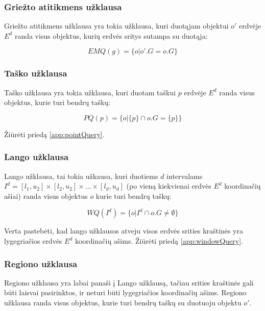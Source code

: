 \subsubsection{Griežto atitikmens užklausa}
Griežto atitikmens užklausa yra tokia užklausa, kuri duotąjam objektui $o'$ erdvėje $E^d$ randa visus objektus, kurių erdvės sritys sutampa su duotąja:

\begin{equation}
	EMQ(g) = \{ o | o'.G = o.G \}
\label{eq:ExactMatchQuery}
\end{equation}

\subsubsection{Taško užklausa}
Taško užklausa yra tokia užklausa, kuri duotam taškui $p$ erdvėje $E^d$ randa visus objektus, kurie turi bendrų taškų:

\begin{equation}
	PQ(p) = \{ o | \{p\} \cap o.G = \{p\} \}
\label{eq:ExactMatchQuery}
\end{equation}

Žiūrėti priedą \ref{app:pointQuery}.

\subsubsection{Lango užklausa}
Lango užklausa, tai tokia užkausa, kuri duotiems $d$ intervalams $I^d = [l_1, u_2] \times [l_2, u_2] \times ... \times [l_d, u_d]$ (po vieną kiekvienai erdvės $E^d$ koordinačių ašiai) randa visus objektus $o$ kurie turi bendrų taškų:

\begin{equation}
	WQ(I^d) = \{ o | I^d \cap o.G \neq \emptyset \}
\label{eq:ExactMatchQuery}
\end{equation}

Verta pastebėti, kad lango užklausos atveju visos erdvės srities kraštinės yra lygegriačios erdvės $E^d$ koordinačių ašims.
Žiūrėti priedą \ref{app:windowQuery}.


\subsubsection{Regiono užklausa}
Regiono užklausa yra labai panaši į Lango užklausą, tačiau srities kraštinės gali būti laisvai pasirinktos, ir neturi būti lygegriačios koordinačių ašims.
Regiono užklausa randa visus objektus, kurie turi bendrų taškų su duotuoju objektu $o'$.

